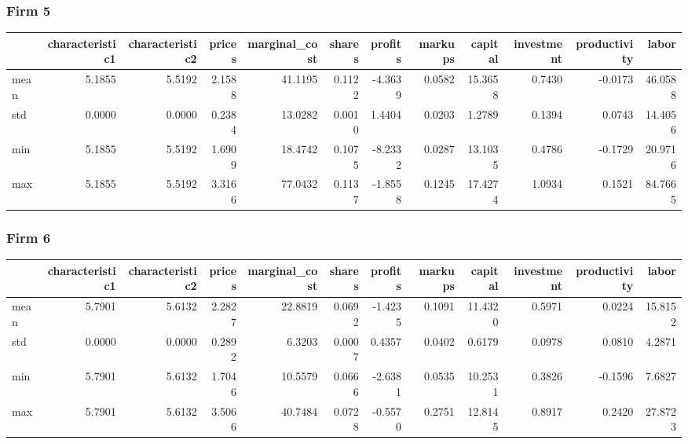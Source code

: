  \subsubsection*{Firm 5}
\begin{tabular}{lrrrrrrrrrrr}
\toprule
{} &  characteristic1 &  characteristic2 &  prices &  marginal\_cost &  shares &  profits &  markups &  capital &  investment &  productivity &   labor \\
\midrule
mean &           5.1855 &           5.5192 &  2.1588 &        41.1195 &  0.1122 &  -4.3639 &   0.0582 &  15.3658 &      0.7430 &       -0.0173 & 46.0588 \\
std  &           0.0000 &           0.0000 &  0.2384 &        13.0282 &  0.0010 &   1.4404 &   0.0203 &   1.2789 &      0.1394 &        0.0743 & 14.4056 \\
min  &           5.1855 &           5.5192 &  1.6909 &        18.4742 &  0.1075 &  -8.2332 &   0.0287 &  13.1035 &      0.4786 &       -0.1729 & 20.9716 \\
max  &           5.1855 &           5.5192 &  3.3166 &        77.0432 &  0.1137 &  -1.8558 &   0.1245 &  17.4274 &      1.0934 &        0.1521 & 84.7665 \\
\bottomrule
\end{tabular}


 \subsubsection*{Firm 6}
\begin{tabular}{lrrrrrrrrrrr}
\toprule
{} &  characteristic1 &  characteristic2 &  prices &  marginal\_cost &  shares &  profits &  markups &  capital &  investment &  productivity &   labor \\
\midrule
mean &           5.7901 &           5.6132 &  2.2827 &        22.8819 &  0.0692 &  -1.4235 &   0.1091 &  11.4320 &      0.5971 &        0.0224 & 15.8152 \\
std  &           0.0000 &           0.0000 &  0.2892 &         6.3203 &  0.0007 &   0.4357 &   0.0402 &   0.6179 &      0.0978 &        0.0810 &  4.2871 \\
min  &           5.7901 &           5.6132 &  1.7046 &        10.5579 &  0.0666 &  -2.6381 &   0.0535 &  10.2531 &      0.3826 &       -0.1596 &  7.6827 \\
max  &           5.7901 &           5.6132 &  3.5066 &        40.7484 &  0.0728 &  -0.5570 &   0.2751 &  12.8145 &      0.8917 &        0.2420 & 27.8723 \\
\bottomrule
\end{tabular}


